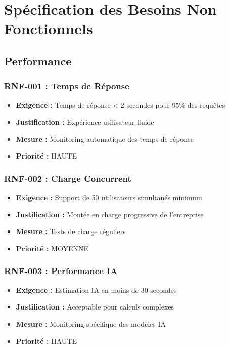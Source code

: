 
\section{Spécification des Besoins Non Fonctionnels}

\subsection{Performance}

\subsubsection{RNF-001 : Temps de Réponse}
\begin{itemize}
    \item \textbf{Exigence :} Temps de réponse < 2 secondes pour 95\% des requêtes
    \item \textbf{Justification :} Expérience utilisateur fluide
    \item \textbf{Mesure :} Monitoring automatique des temps de réponse
    \item \textbf{Priorité :} HAUTE
\end{itemize}

\subsubsection{RNF-002 : Charge Concurrent}
\begin{itemize}
    \item \textbf{Exigence :} Support de 50 utilisateurs simultanés minimum
    \item \textbf{Justification :} Montée en charge progressive de l'entreprise
    \item \textbf{Mesure :} Tests de charge réguliers
    \item \textbf{Priorité :} MOYENNE
\end{itemize}

\subsubsection{RNF-003 : Performance IA}
\begin{itemize}
    \item \textbf{Exigence :} Estimation IA en moins de 30 secondes
    \item \textbf{Justification :} Acceptable pour calculs complexes
    \item \textbf{Mesure :} Monitoring spécifique des modèles IA
    \item \textbf{Priorité :} HAUTE
\end{itemize}

